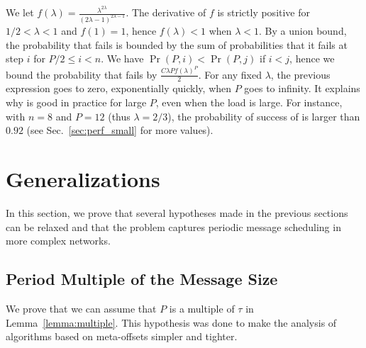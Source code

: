 \documentclass[pdflatex,sn-mathphys,iicol]{sn-jnl}%
\theoremstyle{thmstyleone}%
\theoremstyle{thmstyletwo}%
\theoremstyle{thmstylethree}%
\begin{document}
We let $f(\lambda) = \frac{\lambda^{2\lambda}}{(2\lambda -1)^{2\lambda -1}}$.
The derivative of $f$ is strictly positive for $1/2 < \lambda < 1$ and $f(1) = 1$, hence $f(\lambda) < 1$ when $\lambda < 1$. By a union bound, the probability that \greedyuniform fails is bounded by the sum of probabilities that it fails at step $i$ for $P/2 \leq i < n$. We have $\Pr(P,i) < \Pr(P,j)$
if $i < j$, hence we bound the probability that \greedyuniform fails by $\frac{C \lambda P f(\lambda)^P}{2}$. For any fixed $\lambda$, the previous expression goes to zero, exponentially quickly, when $P$ goes to infinity. It explains why \greedyuniform is good in practice for large $P$, even when the load is large. 
For instance, with $n = 8$ and $P=12$ (thus $\lambda = 2/3$), the probability of success of \greedyuniform is larger than $0.92$ (see Sec.~\ref{sec:perf_small} for more values).


\section{Generalizations}\label{sec:gen}

In this section, we prove that several hypotheses made in the previous sections can be relaxed and that the problem \pma captures periodic message scheduling in more complex networks.

\subsection{Period Multiple of the Message Size}


We prove that we can assume that $P$ is a multiple of $\tau$ in Lemma~\ref{lemma:multiple}. This hypothesis was done to make the analysis of algorithms based on meta-offsets simpler and tighter. 
\end{document}
